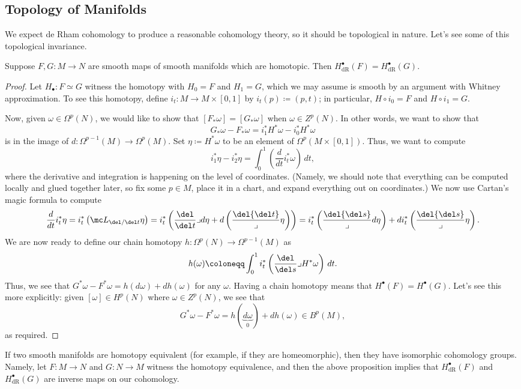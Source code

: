 \documentclass[../notes.tex]{subfiles}
\begin{document}
\subsection{Topology of Manifolds}
We expect de Rham cohomology to produce a reasonable cohomology theory, so it should be topological in nature. Let's see some of this topological invariance.
\begin{proposition}
	Suppose $F,G\colon M\to N$ are smooth maps of smooth manifolds which are homotopic. Then $H^\bullet_{\mathrm{dR}}(F)=H^\bullet_{\mathrm{dR}}(G)$.
\end{proposition}
\begin{proof}
	Let $H_\bullet\colon F\simeq G$ witness the homotopy with $H_0=F$ and $H_1=G$, which we may assume is smooth by an argument with Whitney approximation. To see this homotopy, define $i_t\colon M\to M\times[0,1]$ by $i_t(p)\coloneqq(p,t)$; in particular, $H\circ i_0=F$ and $H\circ i_1=G$.

	Now, given $\omega\in\Omega^p(N)$, we would like to show that $[F_*\omega]=[G_*\omega]$ when $\omega\in Z^p(N)$. In other words, we want to show that
	\[G_*\omega-F_*\omega=i_1^*H^*\omega-i_0^*H^*\omega\]
	is in the image of $d\colon\Omega^{p-1}(M)\to\Omega^p(M)$. Set $\eta\coloneqq H^*\omega$ to be an element of $\Omega^p(M\times[0,1])$. Thus, we want to compute
	\[i_1^*\eta-i_2^*\eta=\int_0^1\left(\frac d{dt}i_t^*\omega\right)\,dt,\]
	where the derivative and integration is happening on the level of coordinates. (Namely, we should note that everything can be computed locally and glued together later, so fix some $p\in M$, place it in a chart, and expand everything out on coordinates.) We now use Cartan's magic formula to compute
	\[\frac d{dt}i_t^*\eta=i_t^*\left(\mc L_{\del/\del t}\eta\right)=i_t^*\left(\frac{\del}{\del t}\lrcorner d\eta+d\left(\frac\del{\del t}\lrcorner\eta\right)\right)=i_t^*\left(\frac\del{\del s}\lrcorner d\eta\right)+di_t^*\left(\frac\del{\del s}\lrcorner\eta\right).\]
	We are now ready to define our chain homotopy $h\colon\Omega^p(N)\to\Omega^{p-1}(M)$ as
	\[h(\omega)\coloneqq\int_0^1i_t^*\left(\frac{\del}{\del s}\lrcorner H^*\omega\right)\,dt.\]
	Thus, we see that $G^*\omega-F^*\omega=h(d\omega)+dh(\omega)$ for any $\omega$. Having a chain homotopy means that $H^\bullet(F)=H^\bullet(G)$. Let's see this more explicitly: given $[\omega]\in H^p(N)$ where $\omega\in Z^p(N)$, we see that
	\[G^*\omega-F^*\omega=h(\underbrace{d\omega}_0)+dh(\omega)\in B^p(M),\]
	as required.
\end{proof}
\begin{example}
	If two smooth manifolds are homotopy equivalent (for example, if they are homeomorphic), then they have isomorphic cohomology groups. Namely, let $F\colon M\to N$ and $G\colon N\to M$ witness the homotopy equivalence, and then the above proposition implies that $H^\bullet_{\mathrm{dR}}(F)$ and $H^\bullet_{\mathrm{dR}}(G)$ are inverse maps on our cohomology.
\end{example}
\end{document}
